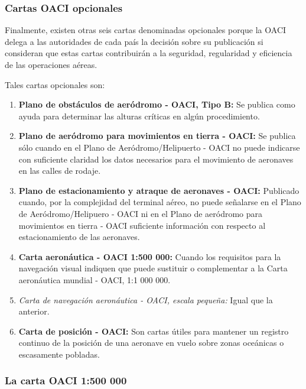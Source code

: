 \documentclass[a4paper,12pt,twoside]{article}
\begin{document}
\subsubsection{Cartas OACI opcionales}

Finalmente, existen otras seis cartas denominadas opcionales porque la OACI delega a las autoridades de cada pa\'is la decisi\'on sobre su publicaci\'on si consideran que estas cartas contribuir\'an a la seguridad, regularidad y eficiencia de las operaciones a\'ereas.

Tales cartas opcionales son:

\begin{enumerate}
\item \textbf{Plano de obst\'aculos de aer\'odromo - OACI, Tipo B:} Se publica
  como ayuda para determinar las alturas cr\'iticas en alg\'un
  procedimiento.

\item  \textbf{Plano de aer\'odromo para movimientos en tierra - OACI:} Se
  publica s\'olo cuando en el Plano de Aer\'odromo/Helipuerto - OACI
  no puede indicarse con suficiente claridad los datos necesarios para
  el movimiento de aeronaves en las calles de rodaje.

\item  \textbf{Plano de estacionamiento y atraque de aeronaves - OACI: }Publicado
  cuando, por la complejidad del terminal a\'ereo, no puede se\~nalarse en
  el Plano de Aer\'odromo/Helipuero - OACI ni en el Plano de
  aer\'odromo para movimientos en tierra - OACI suficiente
  informaci\'on con respecto al estacionamiento de las aeronaves.

\item  \textbf{Carta aeron\'autica - OACI 1:500 000:} Cuando los requisitos para la
  navegaci\'on visual indiquen que puede sustituir o complementar a la
  Carta aeron\'autica mundial - OACI, 1:1 000 000.

\item  \emph{Carta de navegaci\'on aeron\'autica - OACI, escala peque\~na:} Igual
  que la anterior.

\item \textbf{ Carta de posici\'on - OACI:} Son cartas \'utiles para mantener un
  registro continuo de la posici\'on de una aeronave en vuelo sobre
  zonas oce\'anicas o escasamente pobladas.
\end{enumerate}

\subsubsection{La carta OACI 1:500 000}
\end{document}
